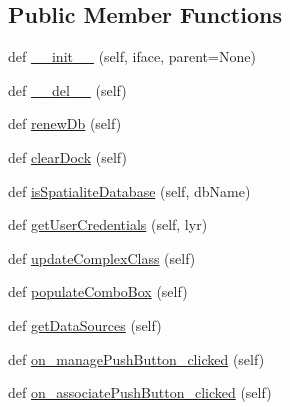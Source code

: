 \subsection*{Public Member Functions}
\begin{DoxyCompactItemize}
\item 
def \mbox{\hyperlink{class_dsg_tools_1_1_complex_tools_1_1complex_window_1_1_complex_window_a12006c62a18ab276bb4f39c6525bfc26}{\+\_\+\+\_\+init\+\_\+\+\_\+}} (self, iface, parent=None)
\item 
def \mbox{\hyperlink{class_dsg_tools_1_1_complex_tools_1_1complex_window_1_1_complex_window_ab89113472e2ef4fc591f7c188aa752b9}{\+\_\+\+\_\+del\+\_\+\+\_\+}} (self)
\item 
def \mbox{\hyperlink{class_dsg_tools_1_1_complex_tools_1_1complex_window_1_1_complex_window_a3be29012c77571d5328439ee89b8404d}{renew\+Db}} (self)
\item 
def \mbox{\hyperlink{class_dsg_tools_1_1_complex_tools_1_1complex_window_1_1_complex_window_a32017933c586a405679d74c6e822132d}{clear\+Dock}} (self)
\item 
def \mbox{\hyperlink{class_dsg_tools_1_1_complex_tools_1_1complex_window_1_1_complex_window_a15c02d111037e49f28f80d537ae76d22}{is\+Spatialite\+Database}} (self, db\+Name)
\item 
def \mbox{\hyperlink{class_dsg_tools_1_1_complex_tools_1_1complex_window_1_1_complex_window_a14d77bda16484cd0b5c53c23f44c4a2d}{get\+User\+Credentials}} (self, lyr)
\item 
def \mbox{\hyperlink{class_dsg_tools_1_1_complex_tools_1_1complex_window_1_1_complex_window_adae9aafc227935f7b346b95d2f8560fa}{update\+Complex\+Class}} (self)
\item 
def \mbox{\hyperlink{class_dsg_tools_1_1_complex_tools_1_1complex_window_1_1_complex_window_a9b2244418126aae98c5d05ef78848ca2}{populate\+Combo\+Box}} (self)
\item 
def \mbox{\hyperlink{class_dsg_tools_1_1_complex_tools_1_1complex_window_1_1_complex_window_a4342f9df9ceb2b074509474ce8fa32d0}{get\+Data\+Sources}} (self)
\item 
def \mbox{\hyperlink{class_dsg_tools_1_1_complex_tools_1_1complex_window_1_1_complex_window_acd28666ddddd5ff62cdf00531b484cf4}{on\+\_\+manage\+Push\+Button\+\_\+clicked}} (self)
\item 
def \mbox{\hyperlink{class_dsg_tools_1_1_complex_tools_1_1complex_window_1_1_complex_window_a38d766c9c5d37678bcbf0018f2d13a1c}{on\+\_\+associate\+Push\+Button\+\_\+clicked}} (self)
\item 

\end{DoxyCompactItemize}
